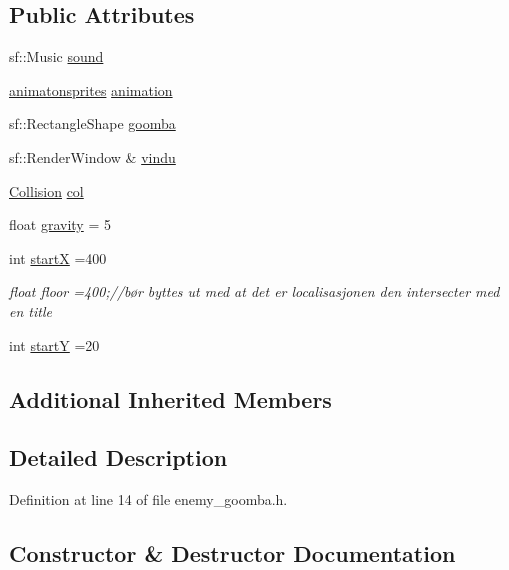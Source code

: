 \subsection*{Public Attributes}
\begin{DoxyCompactItemize}
\item 
sf\+::\+Music \hyperlink{class_enemy___goomba_ae247248654854e3be4e5cecc6bea1b08}{sound}
\item 
\hyperlink{classanimatonsprites}{animatonsprites} \hyperlink{class_enemy___goomba_a6e754ed916291f62f4ece73a30903f68}{animation}
\item 
sf\+::\+Rectangle\+Shape \hyperlink{class_enemy___goomba_a06e972cccfe94936721859c90729d3f3}{goomba}
\item 
sf\+::\+Render\+Window \& \hyperlink{class_enemy___goomba_ab4eed505739ee97ea1c682c04b642537}{vindu}
\item 
\hyperlink{class_collision}{Collision} \hyperlink{class_enemy___goomba_a435110bcd5fc30fd2ff0a0d9347c49f3}{col}
\item 
float \hyperlink{class_enemy___goomba_a04e563eef4eda0f20083576ceed3669a}{gravity} = 5
\item 
int \hyperlink{class_enemy___goomba_a4f762d1bb68be95f6ed06a25d5f61721}{startX} =400
\begin{DoxyCompactList}\small\item\em float floor =400;//bør byttes ut med at det er localisasjonen den intersecter med en title \end{DoxyCompactList}\item 
int \hyperlink{class_enemy___goomba_a8d459a604218f1a007e8e62ba95dd70a}{startY} =20
\end{DoxyCompactItemize}
\subsection*{Additional Inherited Members}


\subsection{Detailed Description}


Definition at line 14 of file enemy\+\_\+goomba.\+h.



\subsection{Constructor \& Destructor Documentation}
\hypertarget{class_enemy___goomba_af5a9b3d667381890746453f0dfaa50e6}{}\label{class_enemy___goomba_af5a9b3d667381890746453f0dfaa50e6} 
